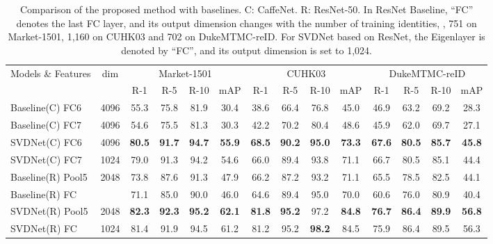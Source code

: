 \documentclass[10pt,twocolumn,letterpaper]{article}
\begin{document}
\begin{table*}[]
\begin{center}
\begin{tabular}{l|c|c c c c|c c c c|c c c c}
\hline
\multicolumn{1}{c|}{\multirow{2}{*}{Models \& Features}}&\multicolumn{1}{c|}{\multirow{2}{*}{dim}}&\multicolumn{4}{c|}{Market-1501} & \multicolumn{4}{c|}{CUHK03} & \multicolumn{4}{c}{DukeMTMC-reID}\\ 
\cline{3-14}
\multicolumn{1}{c|}{}&\multicolumn{1}{c|}{}&\multicolumn{1}{c}{R-1}&{R-5}&{R-10}&{mAP}&{R-1}&{R-5}&{R-10}&{mAP}&{R-1}&{R-5}&{R-10}&{mAP}\\
\hline
Baseline(C) FC6 & 4096 &55.3&75.8&81.9&30.4 & 38.6 & 66.4& 76.8&45.0 &46.9&63.2&69.2&28.3\\

Baseline(C) FC7&4096   &54.6&75.5&81.3&30.3  &42.2&70.2&80.4&48.6    &45.9&62.0&69.7&27.1\\


SVDNet(C) FC6 &4096  &\textbf{80.5}&\textbf{91.7}&\textbf{94.7}&\textbf{55.9}
  &\textbf{68.5}&\textbf{90.2}&\textbf{95.0}&\textbf{73.3}   &\textbf{67.6}&\textbf{80.5}&\textbf{85.7}&\textbf{45.8}\\

SVDNet(C) FC7  &1024 &79.0&91.3&94.2&54.6  &66.0&89.4&93.8&71.1    &66.7&80.5&85.1&44.4\\

\hline
Baseline(R) Pool5&2048   &73.8&87.6&91.3&47.9  &66.2&87.2&93.2&71.1    &65.5&78.5&82.5&44.1\\

Baseline(R) FC   &      &71.1&85.0&90.0&46.0  &64.6&89.4&95.0&70.0    &60.6&76.0&80.9&40.4\\

SVDNet(R) Pool5 &2048  &\textbf{82.3}&\textbf{92.3}&\textbf{95.2}&\textbf{62.1}  
&\textbf{81.8}&\textbf{95.2}&97.2&\textbf{84.8}   
 &\textbf{76.7}&\textbf{86.4}&\textbf{89.9}&\textbf{56.8}\\

SVDNet(R) FC    &1024  &81.4&91.9&94.5&61.2  &81.2&95.2&\textbf{98.2}&84.5    &75.9&86.4&89.5&56.3\\
\hline 
\end{tabular}

\end{center}
\setlength{\abovecaptionskip}{-0cm} 
\caption{Comparison of the proposed method with baselines. C: CaffeNet. R: ResNet-50. In ResNet Baseline, ``FC'' denotes the last FC layer, and its output dimension  changes with the number of training identities, \ie, 751 on Market-1501, 1,160 on CUHK03 and 702 on DukeMTMC-reID. For SVDNet based on ResNet, the Eigenlayer is denoted by ``FC'', and its output dimension is set to 1,024.}
\label{table:cmpbasl}
\end{table*}
\end{document}
